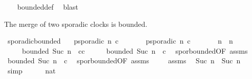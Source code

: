 \begin{isabellebody}
\ \ \isamarkupfalse%
\ bounded{\isacharunderscore}def\ \isamarkupfalse%
\ blast%
\endisatagproof
{\isafoldproof}%
%
\isadelimproof
%
\endisadelimproof
%
\begin{isamarkuptext}%
The merge of two sporadic clocks is bounded.%
\end{isamarkuptext}\isamarkuptrue%
\isamarkupfalse%
\ sporadic{\isacharunderscore}bounded{}{\isacharcolon}\isanewline
\ \ \ {\isacartoucheopen}p{\isacharunderscore}sporadic\ n\ c{\isacartoucheclose}\isanewline
\ \ \ \ \ \ \ {\isacartoucheopen}p{\isacharunderscore}sporadic\ n{\isacharprime}\ c{\isacharprime}{\isacartoucheclose}\isanewline
\ \ \ \ \ \ \ {\isacartoucheopen}n{\isacharprime}\ {\isasymge}\ n{\isacartoucheclose}\isanewline
\ \ \ \ \ {\isacartoucheopen}bounded\ {\isacharparenleft}Suc\ n{\isacharparenright}\ {}\ {\isacharparenleft}c{\isasymoplus}c{\isacharprime}{\isacharparenright}{\isacartoucheclose}\isanewline
%
\isadelimproof
%
\endisadelimproof
%
\isatagproof
{}\isamarkupfalse%
\ {\isacharminus}\isanewline
\ \ \isamarkupfalse%
\ {}{\isacharcolon}{\isacartoucheopen}bounded\ {\isacharparenleft}Suc\ n{\isacharparenright}\ {}\ c{\isacartoucheclose}\ \isamarkupfalse%
\ spor{\isacharunderscore}bounded{\isacharbrackleft}OF\ assms{\isacharparenleft}{}{\isacharparenright}{\isacharbrackright}\ \isacommand{{\isachardot}}\isamarkupfalse%
\isanewline
\ \ \isamarkupfalse%
\ {}{\isacharcolon}{\isacartoucheopen}bounded\ {\isacharparenleft}Suc\ n{\isacharprime}{\isacharparenright}\ {}\ c{\isacharprime}{\isacartoucheclose}\ \isamarkupfalse%
\ spor{\isacharunderscore}bounded{\isacharbrackleft}OF\ assms{\isacharparenleft}{}{\isacharparenright}{\isacharbrackright}\ \isacommand{{\isachardot}}\isamarkupfalse%
\isanewline
\ \ \isamarkupfalse%
\ assms{\isacharparenleft}{}{\isacharparenright}\ \isamarkupfalse%
\ {}{\isacharcolon}{\isacartoucheopen}Suc\ n{\isacharprime}\ {\isasymge}\ Suc\ n{\isacartoucheclose}\ \isamarkupfalse%
\ simp\isanewline
\ \ \isamarkupfalse%
\ {\isacartoucheopen}{}{\isacharplus}{}\ {\isacharequal}\ {\isacharparenleft}{}{\isacharcolon}{\isacharcolon}nat{\isacharparenright}{\isacartoucheclose}\ \isamarkupfalse%

\end{isabellebody}

